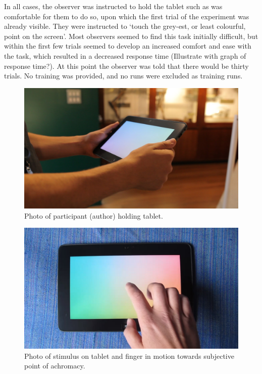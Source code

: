 In all cases, the observer was instructed to hold the tablet such as was comfortable for them to do so, upon which the first trial of the experiment was already visible. They were instructed to `touch the grey-est, or least colourful, point on the screen'. Most observers seemed to find this task initially difficult, but within the first few trials seemed to develop an increased comfort and ease with the task, which resulted in a decreased response time (Illustrate with graph of response time?). At this point the observer was told that there would be thirty trials. No training was provided, and no runs were excluded as training runs.

\begin{figure}[hbp]
\includegraphics[width=\textwidth]{figs/tablet/MVI_3213-1.jpg} %
\caption{Photo of participant (author) holding tablet.}
\label{fig:grant_demo}
\end{figure}

\begin{figure}[hbp]
\includegraphics[width=\textwidth]{figs/tablet/MVI_3889-4.jpg} %
\caption{Photo of stimulus on tablet and finger in motion towards subjective point of achromacy.}
\label{fig:finger}
\end{figure}

